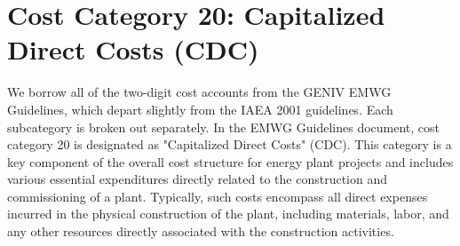 \section{Cost Category 20: Capitalized Direct Costs (CDC)}

We borrow all of the two-digit cost accounts from the GENIV EMWG Guidelines, which depart slightly from the IAEA 2001 guidelines.  Each subcategory is broken out separately.  In the EMWG Guidelines document, cost category 20 is designated as "Capitalized Direct Costs" (CDC). This category is a key component of the overall cost structure for energy plant projects and includes various essential expenditures directly related to the construction and commissioning of a plant. Typically, such costs encompass all direct expenses incurred in the physical construction of the plant, including materials, labor, and any other resources directly associated with the construction activities.



